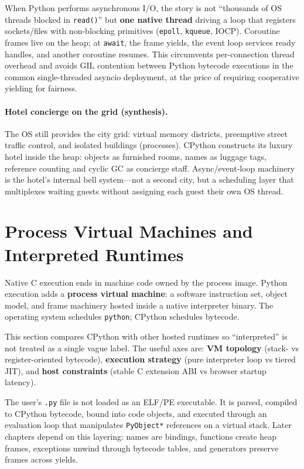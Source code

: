 \documentclass[a4paper,twoside]{report}
\begin{document}
When Python performs asynchronous I/O, the story is not ``thousands of OS threads blocked in \texttt{read()}'' but \textbf{one native thread} driving a loop that registers sockets/files with non-blocking primitives (\texttt{epoll}, \texttt{kqueue}, IOCP). Coroutine frames live on the heap; at \texttt{await}, the frame yields, the event loop services ready handles, and another coroutine resumes. This circumvents per-connection thread overhead and avoids GIL contention between Python bytecode executions in the common single-threaded asyncio deployment, at the price of requiring cooperative yielding for fairness.

\paragraph{Hotel concierge on the grid (synthesis).}
The OS still provides the city grid: virtual memory districts, preemptive street traffic control, and isolated buildings (processes). CPython constructs its luxury hotel inside the heap: objects as furnished rooms, names as luggage tags, reference counting and cyclic GC as concierge staff. Async/event-loop machinery is the hotel's internal bell system---not a second city, but a scheduling layer that multiplexes waiting guests without assigning each guest their own OS thread.


\section{Process Virtual Machines and Interpreted Runtimes}

Native C execution ends in machine code owned by the process image. Python execution adds a \textbf{process virtual machine}: a software instruction set, object model, and frame machinery hosted inside a native interpreter binary. The operating system schedules \texttt{python}; CPython schedules bytecode.

This section compares CPython with other hosted runtimes so ``interpreted'' is not treated as a single vague label. The useful axes are: \textbf{VM topology} (stack- vs register-oriented bytecode), \textbf{execution strategy} (pure interpreter loop vs tiered JIT), and \textbf{host constraints} (stable C extension ABI vs browser startup latency).

The user's \texttt{.py} file is not loaded as an ELF/PE executable. It is parsed, compiled to CPython bytecode, bound into code objects, and executed through an evaluation loop that manipulates \texttt{PyObject*} references on a virtual stack. Later chapters depend on this layering: names are bindings, functions create heap frames, exceptions unwind through bytecode tables, and generators preserve frames across yields.
\end{document}
